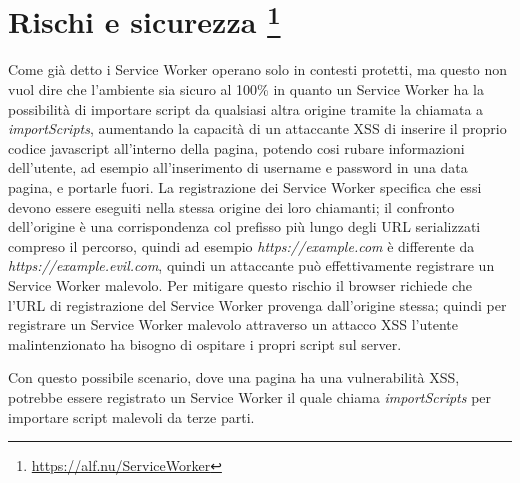 \documentclass[11pt ,a4paper , twoside , openright ]{book}
\begin{document}
	\section[Rischi e sicurezza]{Rischi e sicurezza \cite{rif29}\footnote{\url{https://alf.nu/ServiceWorker}}}
	Come già detto i Service Worker operano solo in contesti protetti, ma questo non vuol dire che l'ambiente sia sicuro al 100\% in quanto un Service Worker ha la possibilità di importare script da qualsiasi altra origine tramite la chiamata a \textit{importScripts}, aumentando la capacità di un attaccante XSS di inserire il proprio codice javascript all'interno della pagina, potendo cosi rubare informazioni dell'utente, ad esempio all'inserimento di username e password in una data pagina, e portarle fuori. La registrazione dei Service Worker specifica che essi devono essere eseguiti nella stessa origine dei loro chiamanti; il confronto dell'origine è una corrispondenza col prefisso più lungo degli URL serializzati compreso il percorso, quindi ad esempio \textit{https://example.com} è differente da \textit{https://example.evil.com}, quindi un attaccante può effettivamente registrare un Service Worker malevolo. Per mitigare questo rischio il browser richiede che l'URL di registrazione del Service Worker provenga dall'origine stessa; quindi per registrare un Service Worker malevolo attraverso un attacco XSS l'utente malintenzionato ha bisogno di ospitare i propri script sul server.
	\\

	Con questo possibile scenario, dove una pagina ha una vulnerabilità XSS, potrebbe essere registrato un Service Worker il quale chiama \textit{importScripts} per importare script malevoli da terze parti.
\end{document}
